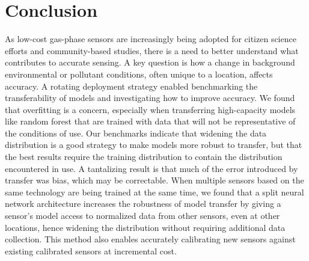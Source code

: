 \documentclass[journal abbreviation, manuscript]{copernicus}
\newcommand\todo[1]{\textcolor{red}{#1}}
\begin{document}
%

\section{Conclusion}

As low-cost gas-phase sensors are increasingly being adopted for citizen science efforts and community-based studies, there is a need to better understand what contributes to accurate sensing.  A key question is how a change in background environmental or pollutant conditions, often unique to a location, affects accuracy.  A rotating deployment strategy enabled benchmarking the transferability of models and investigating how to improve accuracy. We found that overfitting is a concern, especially when transferring high-capacity models like random forest that are trained with data that will not be representative of the conditions of use. Our benchmarks indicate that widening the data distribution is a good strategy to make models more robust to transfer, but that the best results require the training distribution to contain the distribution encountered in use.  A tantalizing result is that much of the error introduced by transfer was bias, which may be correctable.  When multiple sensors based on the same technology are being trained at the same time, we found that a split neural network architecture increases the robustness of model transfer by giving a sensor's model access to normalized data from other sensors, even at other locations, hence widening the distribution without requiring additional data collection.  This method also enables accurately calibrating new sensors against existing calibrated sensors at incremental cost.
\end{document}
